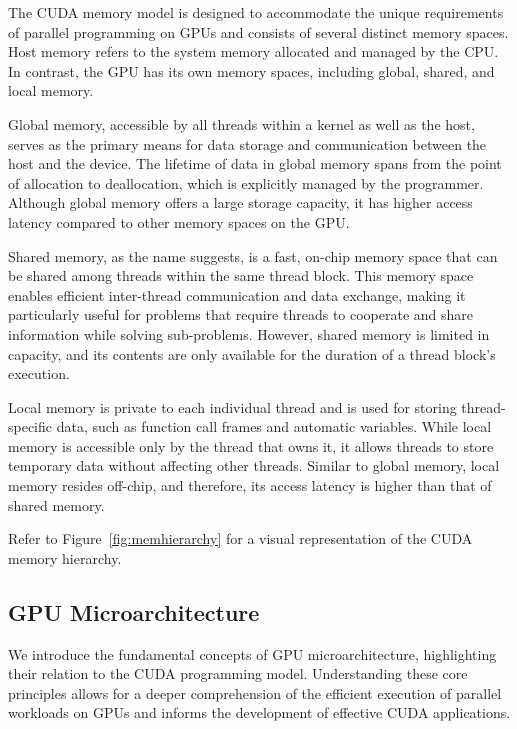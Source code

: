 The CUDA memory model is designed to accommodate the unique requirements of parallel programming 
on GPUs and consists of several distinct memory spaces. Host memory refers to the system memory 
allocated and managed by the CPU. In contrast, the GPU has its own memory spaces, including global, 
shared, and local memory\cite{cuda2016best}.

Global memory, accessible by all threads within a kernel as well as the host, serves as the primary 
means for data storage and communication between the host and the device. The lifetime of data in global 
memory spans from the point of allocation to deallocation, which is explicitly managed by the programmer. 
Although global memory offers a large storage capacity, it has higher access latency compared to other 
memory spaces on the GPU\cite{cuda2016best}.

Shared memory, as the name suggests, is a fast, on-chip memory space that can be shared among threads 
within the same thread block. This memory space enables efficient inter-thread communication and data 
exchange, making it particularly useful for problems that require threads to cooperate and share 
information while solving sub-problems. However, shared memory is limited in capacity, and its contents 
are only available for the duration of a thread block's execution\cite{cuda2016best}.

Local memory is private to each individual thread and is used for storing thread-specific data, such as 
function call frames and automatic variables. While local memory is accessible only by the thread that 
owns it, it allows threads to store temporary data without affecting other threads. Similar to global memory, 
local memory resides off-chip, and therefore, its access latency is higher than that of shared memory.

Refer to Figure~\ref{fig:memhierarchy} for a visual representation of the CUDA memory hierarchy.

\subsection{GPU Microarchitecture}
\label{sec:gpumicroarchitecture}

We introduce the fundamental concepts of GPU microarchitecture, highlighting their 
relation to the CUDA programming model\cite{cuda2016best}. Understanding these core principles allows for a deeper 
comprehension of the efficient execution of parallel workloads on GPUs and informs the development 
of effective CUDA applications.

